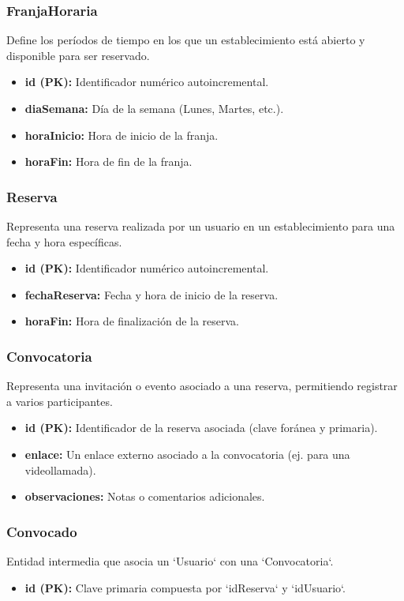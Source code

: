 \subsubsection{FranjaHoraria}
Define los períodos de tiempo en los que un establecimiento está abierto y disponible para ser reservado.
\begin{itemize}
    \item \textbf{id (PK):} Identificador numérico autoincremental.
    \item \textbf{diaSemana:} Día de la semana (Lunes, Martes, etc.).
    \item \textbf{horaInicio:} Hora de inicio de la franja.
    \item \textbf{horaFin:} Hora de fin de la franja.
\end{itemize}

\subsubsection{Reserva}
Representa una reserva realizada por un usuario en un establecimiento para una fecha y hora específicas.
\begin{itemize}
    \item \textbf{id (PK):} Identificador numérico autoincremental.
    \item \textbf{fechaReserva:} Fecha y hora de inicio de la reserva.
    \item \textbf{horaFin:} Hora de finalización de la reserva.
\end{itemize}

\subsubsection{Convocatoria}
Representa una invitación o evento asociado a una reserva, permitiendo registrar a varios participantes.
\begin{itemize}
    \item \textbf{id (PK):} Identificador de la reserva asociada (clave foránea y primaria).
    \item \textbf{enlace:} Un enlace externo asociado a la convocatoria (ej. para una videollamada).
    \item \textbf{observaciones:} Notas o comentarios adicionales.
\end{itemize}

\subsubsection{Convocado}
Entidad intermedia que asocia un `Usuario` con una `Convocatoria`.
\begin{itemize}
    \item \textbf{id (PK):} Clave primaria compuesta por `idReserva` y `idUsuario`.
\end{itemize}

